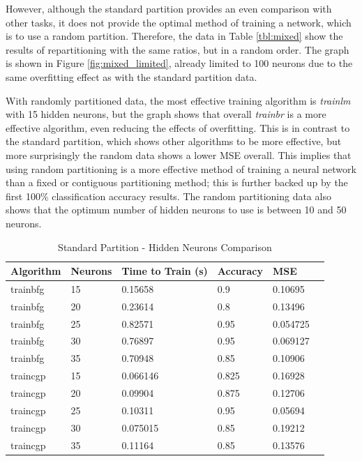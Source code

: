 \documentclass[a4paper, 10pt, conference]{ieeeconf}
\begin{document}
However, although the standard partition provides an even comparison with other tasks, it does not provide the optimal method of training a network, which is to use a random partition. Therefore, the data in Table \ref{tbl:mixed} show the results of repartitioning with the same ratios, but in a random order. The graph is shown in Figure \ref{fig:mixed_limited}, already limited to 100 neurons due to the same overfitting effect as with the standard partition data.

With randomly partitioned data, the most effective training algorithm is \textit{trainlm} with 15 hidden neurons, but the graph shows that overall \textit{trainbr} is a more effective algorithm, even reducing the effects of overfitting. This is in contrast to the standard partition, which shows other algorithms to be more effective, but more surprisingly the random data shows a lower MSE overall. This implies that using random partitioning is a more effective method of training a neural network than a fixed or contiguous partitioning method; this is further backed up by the first 100\% classification accuracy results. The random partitioning data also shows that the optimum number of hidden neurons to use is between 10 and 50 neurons.

\begin{table}
\centering
\caption{Standard Partition - Hidden Neurons Comparison}
\label{tbl:unmixed}
\begin{tabular}{llllll}
\hline
\textbf{Algorithm} & \textbf{Neurons} & \textbf{Time to Train (s)} & \textbf{Accuracy} & \textbf{MSE} \\ \hline
trainbfg & 15 & 0.15658 & 0.9 & 0.10695 \\ \hline 
trainbfg & 20 & 0.23614 & 0.8 & 0.13496 \\ \hline 
trainbfg & 25 & 0.82571 & 0.95 & 0.054725 \\ \hline 
trainbfg & 30 & 0.76897 & 0.95 & 0.069127 \\ \hline 
trainbfg & 35 & 0.70948 & 0.85 & 0.10906 \\ \hline

traincgp & 15 & 0.066146 & 0.825 & 0.16928 \\ \hline 
traincgp & 20 & 0.09904 & 0.875 & 0.12706 \\ \hline 
traincgp & 25 & 0.10311 & 0.95 & 0.05694 \\ \hline 
traincgp & 30 & 0.075015 & 0.85 & 0.19212 \\ \hline 
traincgp & 35 & 0.11164 & 0.85 & 0.13576 \\ \hline 
\end{tabular}
\end{table}
\end{document}
